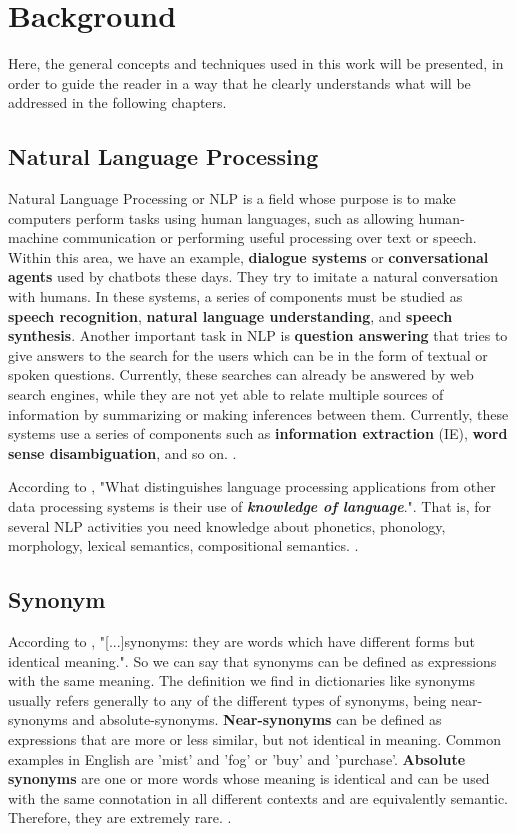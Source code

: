 \section{Background}\label{chap:background}

Here, the general concepts and techniques used in this work will be presented, in order to guide the reader in a way that he clearly understands what will be addressed in the following chapters.

\subsection{Natural Language Processing}

Natural Language Processing or NLP is a field whose purpose is to make computers perform tasks using human languages, such as allowing human-machine communication or performing useful processing over text or speech. Within this area, we have an example, \textbf{dialogue systems} or \textbf{conversational agents} used by chatbots these days. They try to imitate a natural conversation with humans. In these systems, a series of components must be studied as \textbf{speech recognition}, \textbf{natural language understanding}, and \textbf{speech synthesis}. Another important task in NLP is \textbf{question answering} that tries to give answers to the search for the users which can be in the form of textual or spoken questions. Currently, these searches can already be answered by web search engines, while they are not yet able to relate multiple sources of information by summarizing or making inferences between them. Currently, these systems use a series of components such as \textbf{information extraction} (IE), \textbf{word sense disambiguation}, and so on. \cite{Jurafsky:2009:SLP:1214993}.

According to , "What distinguishes language processing applications from other data processing systems is their use of \textit{\textbf{knowledge of language}}.". That is, for several NLP activities you need knowledge about phonetics, phonology, morphology, lexical semantics, compositional semantics. \cite{Jurafsky:2009:SLP:1214993}.


\subsection{Synonym}

According to , "[...]synonyms: they are words which have different forms but identical meaning.". So we can say that synonyms can be defined as expressions with the same meaning. The definition we find in dictionaries like synonyms usually refers generally to any of the different types of synonyms, being near-synonyms and absolute-synonyms. \textbf{Near-synonyms} can be defined as expressions that are more or less similar, but not identical in meaning. Common examples in English are ’mist’ and ’fog’ or ’buy’ and ’purchase’. \textbf{Absolute synonyms} are one or more words whose meaning is identical and can be used with the same connotation in all different contexts and are equivalently semantic.  Therefore, they are extremely rare. \cite{lyons1995linguistic}.

